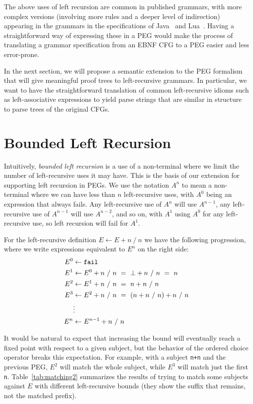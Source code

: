 The above uses of left recursion are common in published grammars,
with more complex versions (involving more rules and a deeper level of
indirection) appearing in the grammars in the specifications of
Java~\cite{spec:java} and Lua~\cite{spec:lua}. Having a straightforward
way of expressing these in a PEG would make the process of translating
a grammar specification from an EBNF CFG to a PEG easier and less error-prone.

In the next section, we will propose a semantic extension to the PEG
formalism that will give meaningful proof trees to left-recursive
grammars. In particular, we want to have the straightforward
translation of common left-recursive idioms such as left-associative
expressions to yield parse strings that are similar in structure to
parse trees of the original CFGs.

\section{Bounded Left Recursion}
\label{sec:left}

Intuitively, {\em bounded left recursion} is a use of a non-terminal
where we limit the number of left-recursive uses it may have. This is
the basis of our extension for supporting left recursion in PEGs. We use the notation $A^n$ to mean a
non-terminal where we can have less than $n$ left-recursive uses,
with $A^0$ being an expression that always fails. Any left-recursive
use of $A^n$ will use $A^{n-1}$, any left-recursive use of $A^{n-1}$
will use $A^{n-2}$, and so on, with $A^1$ using $A^0$ for any
left-recursive use, so left recursion will fail for $A^1$.

For the left-recursive definition $E \leftarrow E+n \ / \ n$ we have
the following progression, where we write expressions equivalent to
$E^n$ on the right side:
\begin{align*}
E^0 & \leftarrow \Nothing \\
E^1 & \leftarrow E^0 + n \ / \ n \ = \ \bot +n \ / \ n \ = \ n \\
E^2 & \leftarrow E^1 + n \ / \ n \ = \ n+n \ / \ n \\
E^3 & \leftarrow E^2 + n \ / \ n \ = \ (n+n \ / \ n)+n \ / \ n \\
& \vdots \\
E^n & \leftarrow E^{n-1} + n \ / \ n
\end{align*}

It would be natural to expect that increasing the bound will
eventually reach a fixed point with respect to a given subject, but
the behavior of the ordered choice operator breaks this expectation.
For example, with a subject {\tt n+n} and the previous PEG, $E^2$ will
match the whole subject, while $E^3$ will match just the first
{\tt n}. Table~\ref{tab:matching2} summarizes the 
results of trying to match some subjects against $E$ with different
left-recursive bounds (they show the
suffix that remains, not the matched prefix). 

